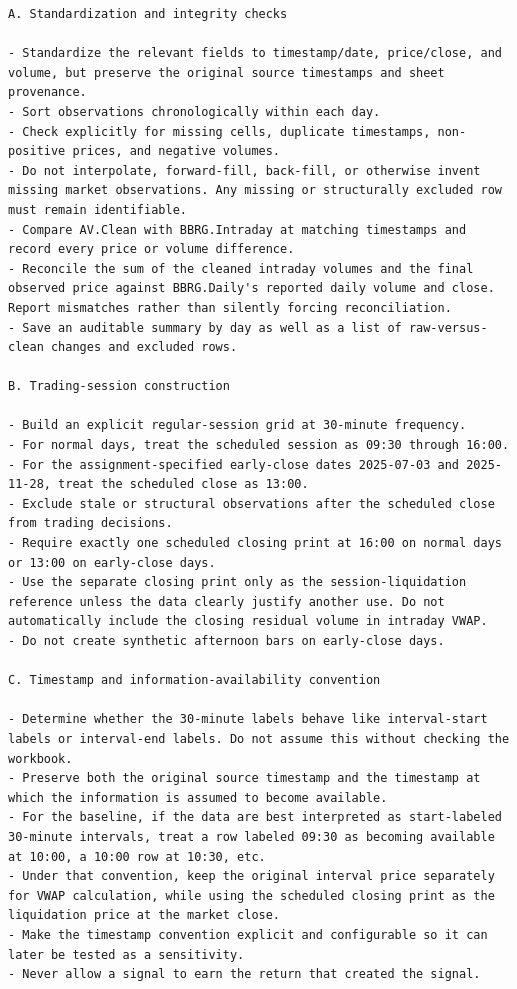 \documentclass{article}
\begin{document}
\begin{lstlisting}
A. Standardization and integrity checks

- Standardize the relevant fields to timestamp/date, price/close, and volume, but preserve the original source timestamps and sheet provenance.
- Sort observations chronologically within each day.
- Check explicitly for missing cells, duplicate timestamps, non-positive prices, and negative volumes.
- Do not interpolate, forward-fill, back-fill, or otherwise invent missing market observations. Any missing or structurally excluded row must remain identifiable.
- Compare AV.Clean with BBRG.Intraday at matching timestamps and record every price or volume difference.
- Reconcile the sum of the cleaned intraday volumes and the final observed price against BBRG.Daily's reported daily volume and close. Report mismatches rather than silently forcing reconciliation.
- Save an auditable summary by day as well as a list of raw-versus-clean changes and excluded rows.

B. Trading-session construction

- Build an explicit regular-session grid at 30-minute frequency.
- For normal days, treat the scheduled session as 09:30 through 16:00.
- For the assignment-specified early-close dates 2025-07-03 and 2025-11-28, treat the scheduled close as 13:00.
- Exclude stale or structural observations after the scheduled close from trading decisions.
- Require exactly one scheduled closing print at 16:00 on normal days or 13:00 on early-close days.
- Use the separate closing print only as the session-liquidation reference unless the data clearly justify another use. Do not automatically include the closing residual volume in intraday VWAP.
- Do not create synthetic afternoon bars on early-close days.

C. Timestamp and information-availability convention

- Determine whether the 30-minute labels behave like interval-start labels or interval-end labels. Do not assume this without checking the workbook.
- Preserve both the original source timestamp and the timestamp at which the information is assumed to become available.
- For the baseline, if the data are best interpreted as start-labeled 30-minute intervals, treat a row labeled 09:30 as becoming available at 10:00, a 10:00 row at 10:30, etc.
- Under that convention, keep the original interval price separately for VWAP calculation, while using the scheduled closing print as the liquidation price at the market close.
- Make the timestamp convention explicit and configurable so it can later be tested as a sensitivity.
- Never allow a signal to earn the return that created the signal.


\end{lstlisting}
\end{document}
